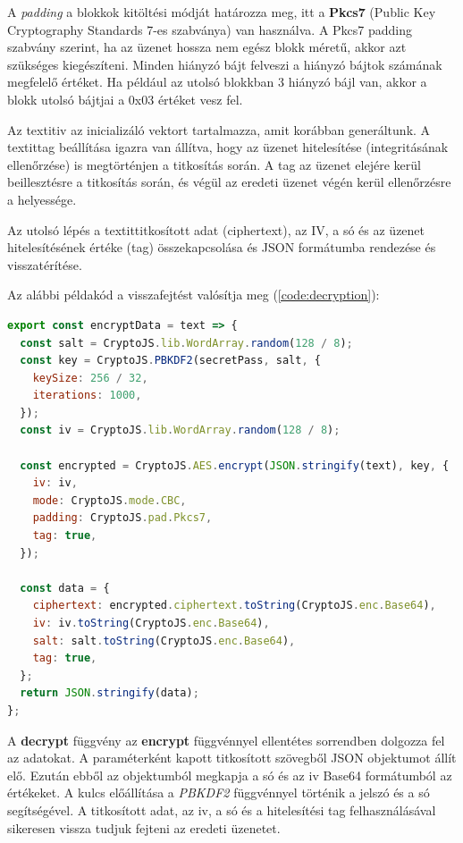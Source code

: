 A  \textit{padding} a blokkok kitöltési módját határozza meg, itt a \textbf{Pkcs7} (Public Key Cryptography Standards 7-es szabványa) van használva. A Pkcs7 padding szabvány szerint, ha az üzenet hossza nem egész blokk méretű, akkor azt szükséges kiegészíteni. Minden hiányzó bájt felveszi a hiányzó bájtok számának megfelelő értéket. Ha például az utolsó blokkban 3 hiányzó bájl van, akkor a blokk utolsó bájtjai a 0x03 értéket vesz fel.

Az textit{iv} az inicializáló vektort tartalmazza, amit korábban generáltunk. A textit{tag} beállítása igazra van állítva, hogy az üzenet hitelesítése (integritásának ellenőrzése) is megtörténjen a titkosítás során. A tag az üzenet elejére kerül beillesztésre a titkosítás során, és végül az eredeti üzenet végén kerül ellenőrzésre a helyessége.

Az utolsó lépés a textit{titkosított adat (ciphertext)}, az IV, a só és az üzenet hitelesítésének értéke (tag) összekapcsolása és JSON formátumba rendezése és visszatérítése.

\pagebreak
Az alábbi példakód a visszafejtést valósítja meg (\ref{code:decryption}):

\begin{lstlisting}[caption={Visszafejtés példakód.}, captionpos=b, language = JavaScript, label={code:decryption}]
export const encryptData = text => {
  const salt = CryptoJS.lib.WordArray.random(128 / 8);
  const key = CryptoJS.PBKDF2(secretPass, salt, {
    keySize: 256 / 32,
    iterations: 1000,
  });
  const iv = CryptoJS.lib.WordArray.random(128 / 8);

  const encrypted = CryptoJS.AES.encrypt(JSON.stringify(text), key, {
    iv: iv,
    mode: CryptoJS.mode.CBC,
    padding: CryptoJS.pad.Pkcs7,
    tag: true,
  });

  const data = {
    ciphertext: encrypted.ciphertext.toString(CryptoJS.enc.Base64),
    iv: iv.toString(CryptoJS.enc.Base64),
    salt: salt.toString(CryptoJS.enc.Base64),
    tag: true,
  };
  return JSON.stringify(data);
};
\end{lstlisting}

A \textbf{decrypt} függvény az \textbf{encrypt} függvénnyel ellentétes sorrendben dolgozza fel az adatokat. A paraméterként kapott titkosított szövegből JSON objektumot állít elő. Ezután ebből az objektumból megkapja a só és az iv Base64 formátumból az értékeket. A kulcs előállítása a \textit{PBKDF2} függvénnyel történik a jelszó és a só segítségével. A titkosított adat, az iv, a só és a hitelesítési tag felhasználásával sikeresen vissza tudjuk fejteni az eredeti üzenetet.

